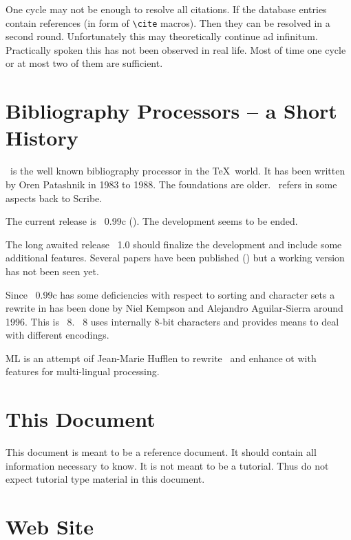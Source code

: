 One cycle may not be enough to resolve all citations. If the database
entries contain references (in form of \verb|\cite|
macros). Then they can be resolved in a
second round. Unfortunately this may theoretically continue ad
infinitum. Practically spoken this has not been observed in real life.
Most of time one cycle or at most two of them are sufficient.


\section{Bibliography Processors -- a Short History}

\BibTeX\ is the well known bibliography processor in the \TeX\ world.
It has been written by Oren Patashnik in 1983
to 1988. The foundations are older. \BibTeX\ refers in some aspects
back to Scribe.

The current release is \BibTeX~0.99c (\cite{btxdoc,btxhak}). The
development seems to be ended.

The long awaited release \BibTeX~1.0 should finalize the development
and include some additional features. Several papers have been published
(\cite{patashnik:bibtex1.0,patashnik:bibtex}) but a working version
has not been seen yet.

Since \BibTeX~0.99c has some deficiencies with respect to sorting and
character sets a rewrite in has been done by Niel
Kempson and Alejandro
Aguilar-Sierra around 1996. This is
\BibTeX~8. \BibTeX~8 uses internally 8-bit characters and provides
means to deal with different encodings.


ML\BibTeX{} is an attempt oif Jean-Marie
Hufflen to rewrite \BibTeX\ and enhance ot
with features for multi-lingual processing.

\INCOMPLETE


\section{This Document}

This document is meant to be a reference document. It should contain
all information necessary to know. It is not meant to be a tutorial.
Thus do not expect tutorial type material in this document.


\section{Web Site}%

